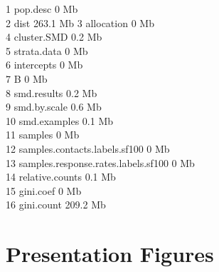 \documentclass[
  man,floatsintext]{apa6}
\begin{document}
1 pop.desc 0 Mb\\
2 dist 263.1 Mb
3 allocation 0 Mb\\
4 cluster.SMD 0.2 Mb\\
5 strata.data 0 Mb\\
6 intercepts 0 Mb\\
7 B 0 Mb\\
8 smd.results 0.2 Mb\\
9 smd.by.scale 0.6 Mb\\
10 smd.examples 0.1 Mb\\
11 samples 0 Mb\\
12 samples.contacts.labels.sf100 0 Mb\\
13 samples.response.rates.labels.sf100 0 Mb\\
14 relative.counts 0.1 Mb\\
15 gini.coef 0 Mb\\
16 gini.count 209.2 Mb

\hypertarget{presentation-figures}{%
\section{Presentation Figures}\label{presentation-figures}}
\end{document}
